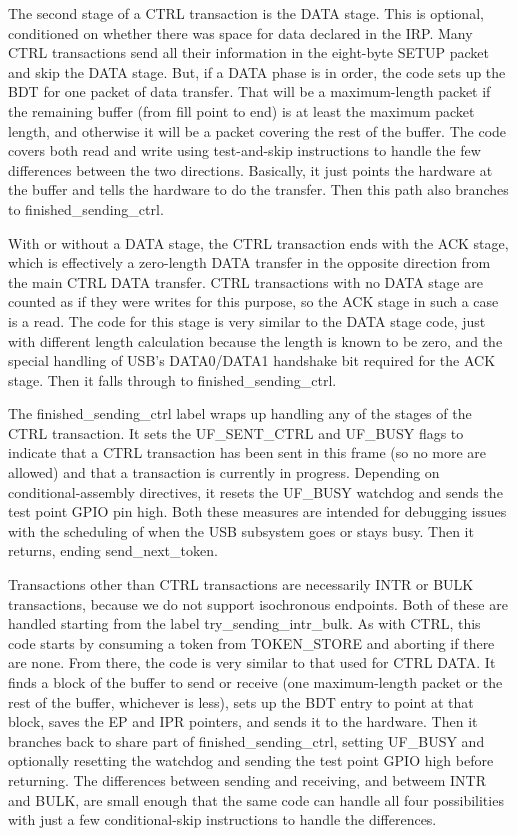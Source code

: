 The second stage of a CTRL transaction is the DATA stage.  This is optional,
conditioned on whether there was space for data declared in the IRP.  Many
CTRL transactions send all their information in the eight-byte SETUP packet
and skip the DATA stage.  But, if a DATA phase is in order, the code sets up
the BDT for one packet of data transfer.  That will be a maximum-length
packet if the remaining buffer (from fill point to end) is at least the
maximum packet length, and otherwise it will be a packet covering the rest
of the buffer.  The code covers both read and write using test-and-skip
instructions to handle the few differences between the two directions. 
Basically, it just points the hardware at the buffer and tells the hardware
to do the transfer.  Then this path also branches to finished\_sending\_ctrl.

With or without a DATA stage, the CTRL transaction ends with the ACK stage,
which is effectively a zero-length DATA transfer in the opposite direction
from the main CTRL DATA transfer.  CTRL transactions with no DATA stage are
counted as if they were writes for this purpose, so the ACK stage in such a
case is a read.  The code for this stage is very similar to the DATA stage
code, just with different length calculation because the length is known to
be zero, and the special handling of USB's DATA0/DATA1 handshake bit
required for the ACK stage.  Then it falls through to
finished\_sending\_ctrl.

The finished\_sending\_ctrl label wraps up handling any of the stages of the
CTRL transaction.  It sets the UF\_SENT\_CTRL and UF\_BUSY flags to indicate
that a CTRL transaction has been sent in this frame (so no more are allowed)
and that a transaction is currently in progress.  Depending on
conditional-assembly directives, it resets the UF\_BUSY watchdog and sends
the test point GPIO pin high.  Both these measures are intended for debugging
issues with the scheduling of when the USB subsystem goes or stays busy. 
Then it returns, ending send\_next\_token.

Transactions other than CTRL transactions are necessarily INTR or BULK
transactions, because we do not support isochronous endpoints.  Both of
these are handled starting from the label try\_sending\_intr\_bulk.  As with
CTRL, this code starts by consuming a token from TOKEN\_STORE and aborting
if there are none.  From there, the code is very similar to that used for
CTRL DATA.  It finds a block of the buffer to send or receive (one
maximum-length packet or the rest of the buffer, whichever is less), sets up
the BDT entry to point at that block, saves the EP and IPR pointers, and
sends it to the hardware.  Then it branches back to share part of
finished\_sending\_ctrl, setting UF\_BUSY and optionally resetting the
watchdog and sending the test point GPIO high before returning.  The
differences between sending and receiving, and betweem INTR and BULK, are
small enough that the same code can handle all four
possibilities with just a few conditional-skip instructions to handle the
differences.

